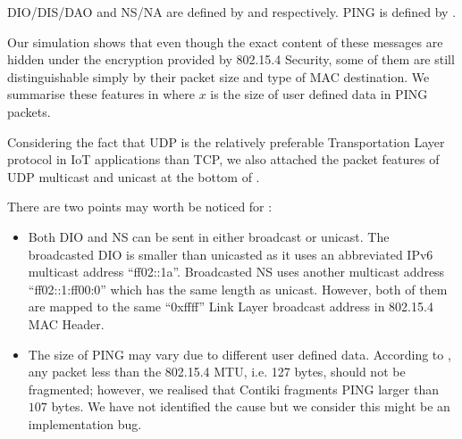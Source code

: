 DIO/DIS/DAO and NS/NA are defined by \cite{rfc6550} and \cite{rfc6775} respectively. PING is defined by \cite{rfc2463}.

Our simulation shows that even though the exact content of these messages are hidden under the encryption provided by 802.15.4 Security, some of them are still distinguishable simply by their packet size and type of MAC destination. We summarise these features in  where $x$ is the size of user defined data in PING packets.

Considering the fact that UDP is the relatively preferable Transportation Layer protocol in IoT applications than TCP, we also attached the packet features of UDP multicast and unicast at the bottom of .

There are two points may worth be noticed for :
\begin{itemize}
	\item Both DIO and NS can be sent in either broadcast or unicast. The broadcasted DIO is smaller than unicasted as it uses an abbreviated IPv6 multicast address ``ff02::1a''. Broadcasted NS uses another multicast address ``ff02::1:ff00:0'' which has the same length as unicast. However, both of them are mapped to the same ``0xffff'' Link Layer broadcast address in 802.15.4 MAC Header.
	\item The size of PING may vary due to different user defined data. According to \cite{rfc4944}, any packet less than the 802.15.4 MTU, i.e. 127 bytes, should not be fragmented; however, we realised that Contiki fragments PING larger than $107$ bytes. We have not identified the cause but we consider this might be an implementation bug.
\end{itemize}

